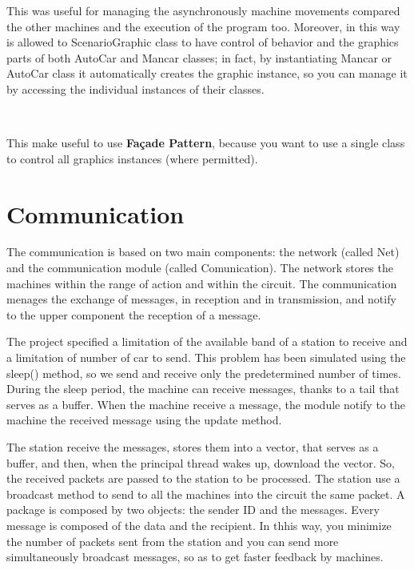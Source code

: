 \documentclass[a4paper,titlepage]{article}
\begin{document}
This was useful for managing the asynchronously machine movements compared the other machines and the execution of the program too. Moreover, in this way is allowed to ScenarioGraphic class to have control of behavior and the graphics parts of both AutoCar and Mancar classes; in fact, by instantiating Mancar or AutoCar class it automatically creates the graphic instance, so you can manage it by accessing the individual instances of their classes.

~

This make useful to use \textbf{Façade Pattern}, because you want to use a single class to control all graphics instances (where permitted).

\newpage

\part{Communication}

The communication is based on two main components: the network (called Net) and the communication module (called Comunication). The network stores the machines within the range of action and within the circuit. The communication menages the exchange of messages, in reception and in transmission, and notify to the upper component the reception of a message.

The project specified a limitation of the available band of a station to receive and a limitation of number of car to send. This problem has been simulated using the sleep() method, so we send and receive only the predetermined number of times.
During the sleep period, the machine can receive messages, thanks to a tail that serves as a buffer. When the machine receive a message, the module notify to the machine the received message using the update method.

The station receive the messages, stores them into a vector, that serves as a buffer, and then, when the principal thread wakes up, download the vector. So, the received packets are passed to the station to be processed.
The station use a broadcast method to send to all the machines into the circuit the same packet.
A package is composed by two objects: the sender ID and the messages. Every message is composed of the data and the recipient. In thhis way, you minimize the number of packets sent from the station and you can send more simultaneously broadcast messages, so as to get faster feedback by machines.
\end{document}
